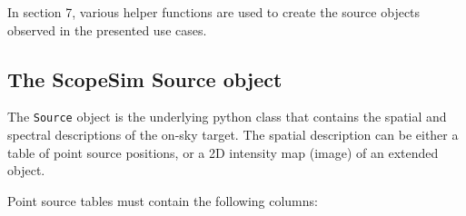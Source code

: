 \begin{figure}[H]
\noindent{}\label{fig-scopesim-templates-cluster-example}
\end{figure}

In section 7, various helper functions are used to create the source objects observed in the presented use cases.


\subsection{The ScopeSim Source object%
  \label{the-scopesim-source-object}%
}

The \texttt{Source} object is the underlying python class that contains the spatial and spectral descriptions of the on-sky target.
The spatial description can be either a table of point source positions, or a 2D intensity map (image) of an extended object.

Point source tables must contain the following columns:

